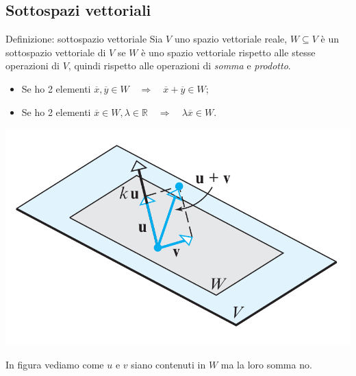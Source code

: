 \documentclass[x11names]{article}
\begin{document}
\subsection{Sottospazi vettoriali}
\begin{center}
\colorbox{myblue}{\begin{minipage}{5.75in}
\begin{blues}{Definizione: sottospazio vettoriale}
Sia $V$ uno spazio vettoriale reale, $W \subseteq V $ è un sottospazio vettoriale di $V$ se $W$ è uno spazio vettoriale rispetto alle stesse operazioni di $V$, quindi rispetto alle operazioni di \textit{somma} e \textit{prodotto}.

\begin{itemize}
	\item Se ho 2 elementi $\overline{x},\overline{y}\in W \quad \Rightarrow \quad \overline{x} + \overline{y} \in W$;
	\item Se ho 2 elementi $\overline{x} \in W, \lambda \in \mathbb{R} \quad \Rightarrow \quad \lambda\overline{x} \in W$.
\end{itemize}

\end{blues}
\end{minipage}}        
\end{center}

\begin{center}
\includegraphics[scale=0.25]{figures/subspace.png}
\end{center}
In figura vediamo come $u$ e $v$ siano contenuti in $W$ ma la loro somma no.
\end{document}
